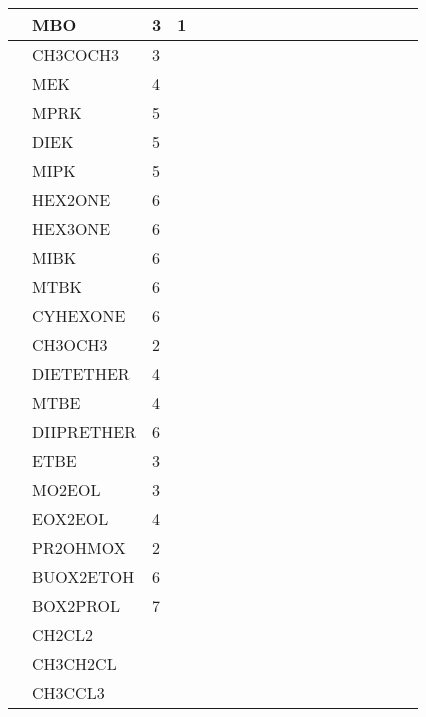 \begin{longtable}{llllllllllllllllll}
	 & MBO & 3 & 1 &  &  &  &  &  &  &  &  &  &  &  &  &  & \\
	\hline \parbox[t]{2mm}{} & CH3COCH3 & 3 &  &  &  &  &  &  &  &  &  &  &  &  &  &  & \\
	 & MEK & 4 &  &  &  &  &  &  &  &  &  &  &  &  &  &  & \\
	 & MPRK & 5 &  &  &  &  &  &  &  &  &  &  &  &  &  &  & \\
	 & DIEK & 5 &  &  &  &  &  &  &  &  &  &  &  &  &  &  & \\
	 & MIPK & 5 &  &  &  &  &  &  &  &  &  &  &  &  &  &  & \\
	 & HEX2ONE & 6 &  &  &  &  &  &  &  &  &  &  &  &  &  &  & \\
	 & HEX3ONE & 6 &  &  &  &  &  &  &  &  &  &  &  &  &  &  & \\
	 & MIBK & 6 &  &  &  &  &  &  &  &  &  &  &  &  &  &  & \\
	 & MTBK & 6 &  &  &  &  &  &  &  &  &  &  &  &  &  &  & \\
	 & CYHEXONE & 6 &  &  &  &  &  &  &  &  &  &  &  &  &  &  & \\
	\hline \parbox[t]{2mm}{} & CH3OCH3 & 2 &  &  &  &  &  &  &  &  &  &  &  &  &  &  & \\
	 & DIETETHER & 4 &  &  &  &  &  &  &  &  &  &  &  &  &  &  & \\
	 & MTBE & 4 &  &  &  &  &  &  &  &  &  &  &  &  &  &  & \\
	 & DIIPRETHER & 6 &  &  &  &  &  &  &  &  &  &  &  &  &  &  & \\
	 & ETBE & 3 &  &  &  &  &  &  &  &  &  &  &  &  &  &  & \\
	 & MO2EOL & 3 &  &  &  &  &  &  &  &  &  &  &  &  &  &  & \\
	 & EOX2EOL & 4 &  &  &  &  &  &  &  &  &  &  &  &  &  &  & \\
	 & PR2OHMOX & 2 &  &  &  &  &  &  &  &  &  &  &  &  &  &  & \\
	 & BUOX2ETOH & 6 &  &  &  &  &  &  &  &  &  &  &  &  &  &  & \\
	 & BOX2PROL & 7 &  &  &  &  &  &  &  &  &  &  &  &  &  &  & \\
	\hline \parbox[t]{2mm}{} & CH2CL2 &  &  &  &  &  &  &  &  &  &  &  &  &  &  &  & \\
	 & CH3CH2CL &  &  &  &  &  &  &  &  &  &  &  &  &  &  &  & \\
	 & CH3CCL3 &  &  &  &  &  &  &  &  &  &  &  &  &  &  &  & \\

\end{longtable}
